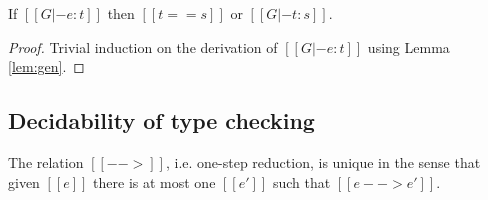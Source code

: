 \begin{lem}\label{lem:corrtyp}
    If $[[G |- e:t]]$ then $[[t == s]]$ or $[[G |- t : s]]$.
\end{lem}

\begin{proof}
    Trivial induction on the derivation of $[[G |- e:t]]$ using Lemma \ref{lem:gen}.
\end{proof}

\subsection{Decidability of type checking}
\begin{lem}\label{lem:unired}
	The relation $[[-->]]$, i.e. one-step reduction, is unique in the sense that given $[[e]]$ there is at most one $[[e']]$ such that $[[e --> e']]$.
\end{lem}

